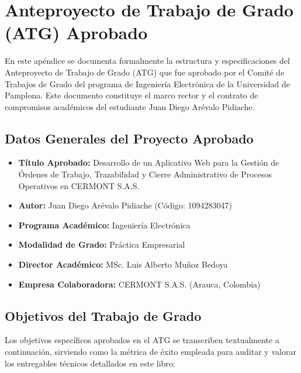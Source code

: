 
\renewcommand{\thechapter}{\Alph{chapter}}

\chapter{Anteproyecto de Trabajo de Grado (ATG) Aprobado}
\label{apendice:atg-aprobado}

En este apéndice se documenta formalmente la estructura y especificaciones del Anteproyecto de Trabajo de Grado (ATG) que fue aprobado por el Comité de Trabajos de Grado del programa de Ingeniería Electrónica de la Universidad de Pamplona. Este documento constituye el marco rector y el contrato de compromisos académicos del estudiante Juan Diego Arévalo Pidiache.

\section{Datos Generales del Proyecto Aprobado}
\begin{itemize}
    \item \textbf{Título Aprobado:} Desarrollo de un Aplicativo Web para la Gestión de Órdenes de Trabajo, Trazabilidad y Cierre Administrativo de Procesos Operativos en CERMONT S.A.S.
    \item \textbf{Autor:} Juan Diego Arévalo Pidiache (Código: 1094283047)
    \item \textbf{Programa Académico:} Ingeniería Electrónica
    \item \textbf{Modalidad de Grado:} Práctica Empresarial
    \item \textbf{Director Académico:} MSc. Luis Alberto Muñoz Bedoya
    \item \textbf{Empresa Colaboradora:} CERMONT S.A.S. (Arauca, Colombia)
\end{itemize}

\section{Objetivos del Trabajo de Grado}
Los objetivos específicos aprobados en el ATG se transcriben textualmente a continuación, sirviendo como la métrica de éxito empleada para auditar y valorar los entregables técnicos detallados en este libro:

